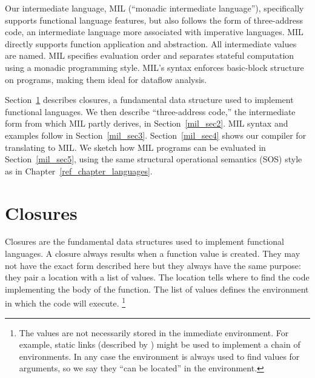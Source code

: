 \documentclass[12pt]{report}
\begin{document}
Our intermediate language, MIL (``monadic intermediate language''),
specifically supports functional language features, but also follows
the form of three-address code, an intermediate language more
associated with imperative languages. MIL directly supports function
application and abstraction. All intermediate values are named. MIL 
specifies evaluation order and separates stateful computation using a
monadic programming style. MIL's syntax enforces basic-block structure
on programs, making them ideal for dataflow analysis.

Section~\ref{mil_sec1} describes closures, a fundamental data
structure used to implement functional languages. We then describe
``three-address code,'' the intermediate form from which MIL partly
derives, in Section~\ref{mil_sec2}.  MIL syntax and examples follow in
Section~\ref{mil_sec3}. Section~\ref{mil_sec4} shows our compiler for
translating \lamC to MIL. We sketch how MIL programs can be evaluated
in Section~\ref{mil_sec5}, using the same structural operational
semantics (SOS) style as in Chapter~\ref{ref_chapter_languages}.







\section{Closures}
\label{mil_sec1}

Closures are the fundamental data structures used to implement
functional languages. A closure always results when a function value is
created. They may not have the exact form described here but they
always have the same purpose: they pair a location with a list of
values. The location tells where to find the code implementing the
body of the function. The list of values defines the environment in
which the code will execute. 
\footnote{The values are not necessarily stored in the immediate
  environment. For example, static links (described by
  \citet[pg.~125]{Appel2003}) might be used to implement a chain of
  environments. In any case the environment is always used to find
  values for arguments, so we say they ``can be located'' in the
  environment.} 
\end{document}
